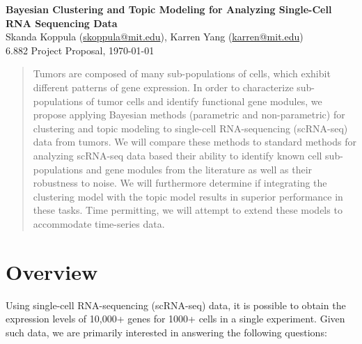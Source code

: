 \documentclass[11pt]{article}
\begin{document}
\begin{centering}
\Large
    \textbf{Bayesian Clustering and Topic Modeling for Analyzing Single-Cell RNA Sequencing Data}  \\
    \vspace{2mm}
    \normalsize
    Skanda Koppula (\url{skoppula@mit.edu}), Karren Yang (\url{karren@mit.edu}) \\
    \vspace{2mm}
    \normalsize
    6.882 Project Proposal, \today \\
\end{centering}
\vspace{5mm}

\begin{abstract}

Tumors are composed of many sub-populations of cells, which exhibit different patterns of gene expression. In order to characterize sub-populations of tumor cells and identify functional gene modules, we propose applying Bayesian methods (parametric and non-parametric) for clustering and topic modeling to single-cell RNA-sequencing (scRNA-seq) data from tumors. We will compare these methods to standard methods for analyzing scRNA-seq data based their ability to identify known cell sub-populations and gene modules from the literature as well as their robustness to noise. We will furthermore determine if integrating the clustering model with the topic model results in superior performance in these tasks. Time permitting, we will attempt to extend these models to accommodate time-series data.

\end{abstract}

\section{Overview}

Using single-cell RNA-sequencing (scRNA-seq) data, it is possible to obtain the expression levels of 10,000+ genes for 1000+ cells in a single experiment. Given such data, we are primarily interested in answering the following questions:
\end{document}
